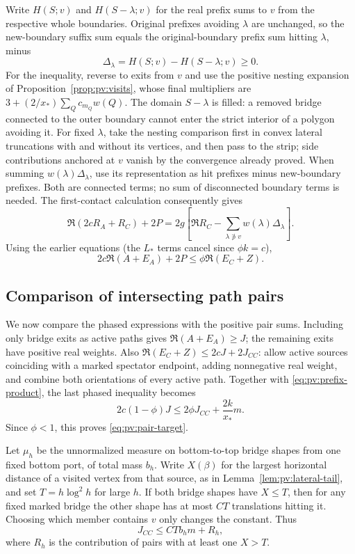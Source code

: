 Write $H(S;v)$ and $H(S-\lambda;v)$ for the real prefix sums to $v$
from the respective whole boundaries. Original prefixes avoiding
$\lambda$ are unchanged, so the new-boundary suffix sum equals the
original-boundary prefix sum hitting $\lambda$, minus
\[
 \Delta_\lambda=H(S;v)-H(S-\lambda;v)\ge0.
\]
For the inequality, reverse to exits from $v$ and use the positive
nesting expansion of Proposition~\ref{prop:pv:visits}, whose final
multipliers are $3+(2/x_*)\sum_Q c_{m_Q}w(Q)$. The domain $S-\lambda$
is filled: a removed bridge connected to the outer boundary cannot
enter the strict interior of a polygon avoiding it. For fixed
$\lambda$, take the nesting comparison first in convex lateral
truncations with and without its vertices, and then pass to the strip;
side contributions anchored at $v$ vanish by the convergence already
proved. When summing $w(\lambda)\Delta_\lambda$, use its representation
as hit prefixes minus new-boundary prefixes. Both are connected
terms; no sum of disconnected boundary terms is needed.
The first-contact calculation consequently gives
\[
 \Re(2cR_A+R_C)+2P=2g\left[\Re R_C-\sum_{\lambda\not\ni v}w(\lambda)\Delta_\lambda\right].
\]
Using the earlier equations (the \(L_*\) terms cancel since \(\phi k=c\)),
\[
 2c\Re(A+E_A)+2P\le \phi\Re(E_C+Z).
\]

\subsection{Comparison of intersecting path pairs}

We now compare the phased expressions with the positive pair sums.
Including only bridge exits as active paths gives $\Re(A+E_A)\ge J$;
the remaining exits have positive real weights. Also
$\Re(E_C+Z)\le2cJ+2J_{CC}$: allow active sources coinciding with a
marked spectator endpoint, adding nonnegative real weight, and combine
both orientations of every active path. Together with
\eqref{eq:pv:prefix-product}, the last phased inequality becomes
\[
 2c(1-\phi)J\le2\phi J_{CC}+\frac{2k}{x_*}m.
\]
Since $\phi<1$, this proves \eqref{eq:pv:pair-target}.

Let $\mu_h$ be the unnormalized measure on bottom-to-top bridge shapes
from one fixed bottom port, of total mass $b_h$. Write $X(\beta)$ for
the largest horizontal distance of a visited vertex from that source,
as in Lemma~\ref{lem:pv:lateral-tail}, and set $T=h\log^2h$ for large
$h$. If both bridge shapes have $X\le T$, then for any fixed marked
bridge the other shape has at most $CT$ translations hitting it.
Choosing which member contains $v$ only changes the constant. Thus
\[
 J_{CC}\le CTb_hm+R_h,
\]
where $R_h$ is the contribution of pairs with at least one $X>T$.

